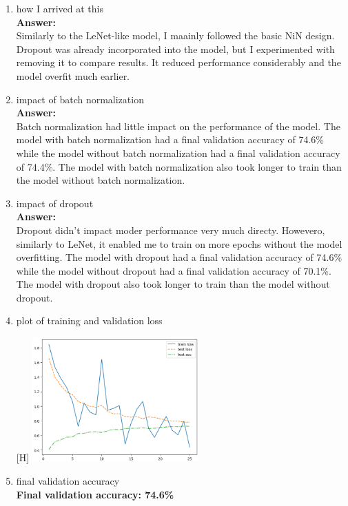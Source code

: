 \documentclass{article}[12pt]
\begin{document}
\begin{enumerate}[(a)]
\begin{enumerate}
        \item how I arrived at this\\
        \textbf{Answer:}\\
        Similarly to the LeNet-like model, I maainly followed the basic NiN design. Dropout was already incorporated into the model, but I experimented with removing it to compare results. It reduced performance considerably and the model overfit much earlier. 
        
        \item impact of batch normalization\\
        \textbf{Answer:}\\
        Batch normalization had little impact on the performance of the model. The model with batch normalization had a final validation accuracy of 74.6\% while the model without batch normalization had a final validation accuracy of 74.4\%. The model with batch normalization also took longer to train than the model without batch normalization.
        
        \item impact of dropout\\
        \textbf{Answer:}\\
        Dropout didn't impact moder performance very much directy. Howevero, similarly to LeNet, it enabled me to train on more epochs without the model overfitting. The model with dropout had a final validation accuracy of 74.6\% while the model without dropout had a final validation accuracy of 70.1\%. The model with dropout also took longer to train than the model without dropout.
        
        \item plot of training and validation loss\\
        \begin{center}[H]
            \includegraphics[width=0.5\textwidth]{plot_newmodel.png}
        \end{center}
        
        \item final validation accuracy\\
        \textbf{Final validation accuracy: 74.6\%}
        
    \end{enumerate}

\end{enumerate}
\end{document}
